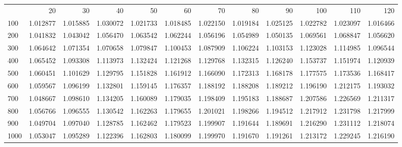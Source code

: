\begin{tabular}{lrrrrrrrrrrr}
 & 20 & 30 & 40 & 50 & 60 & 70 & 80 & 90 & 100 & 110 & 120 \\
100 & 1.012877 & 1.015885 & 1.030072 & 1.021733 & 1.018485 & 1.022150 & 1.019184 & 1.025125 & 1.022782 & 1.023097 & 1.016466 \\
200 & 1.041832 & 1.043042 & 1.056470 & 1.063542 & 1.062244 & 1.056196 & 1.054989 & 1.050135 & 1.069561 & 1.068847 & 1.056620 \\
300 & 1.064642 & 1.071354 & 1.070658 & 1.079847 & 1.100453 & 1.087909 & 1.106224 & 1.103153 & 1.123028 & 1.114985 & 1.096544 \\
400 & 1.065452 & 1.093308 & 1.113973 & 1.132424 & 1.121268 & 1.129768 & 1.132315 & 1.126240 & 1.153737 & 1.151974 & 1.120939 \\
500 & 1.060451 & 1.101629 & 1.129795 & 1.151828 & 1.161912 & 1.166090 & 1.172313 & 1.168178 & 1.177575 & 1.173536 & 1.168417 \\
600 & 1.059567 & 1.096199 & 1.132801 & 1.159145 & 1.176357 & 1.188192 & 1.188208 & 1.189212 & 1.196190 & 1.212175 & 1.193032 \\
700 & 1.048667 & 1.098610 & 1.134205 & 1.160089 & 1.179035 & 1.198409 & 1.195183 & 1.188687 & 1.207586 & 1.226569 & 1.211317 \\
800 & 1.056766 & 1.096555 & 1.130542 & 1.162263 & 1.179655 & 1.201021 & 1.198266 & 1.194512 & 1.217912 & 1.231798 & 1.217999 \\
900 & 1.049704 & 1.097040 & 1.128785 & 1.162462 & 1.179523 & 1.199907 & 1.191644 & 1.189691 & 1.216290 & 1.231112 & 1.218074 \\
1000 & 1.053047 & 1.095289 & 1.122396 & 1.162803 & 1.180099 & 1.199970 & 1.191670 & 1.191261 & 1.213172 & 1.229245 & 1.216190 \\
\end{tabular}
